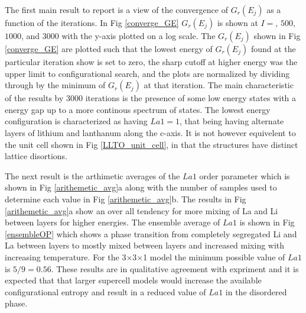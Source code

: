 \documentclass[aps,prl,reprint,superscriptaddress,showkeys]{revtex4-1}
\begin{document}
The first main result to report is a view of the convergence of $G_r(E_j)$ as a function of the iterations. In Fig \ref{converge_GE}  $G_r(E_j)$ is shown at  $I=$, $500$, $1000$, and $3000$ with the y-axis plotted on a log scale. The  $G_r(E_j)$ shown in Fig \ref{converge_GE}  are plotted such that the lowest energy of $G_r(E_j)$ found at the particular iteration show is set to zero, the sharp cutoff at higher energy was the upper limit to configurational search, and the plots are normalized by dividing through by the minimum of $G_r(E_j)$ at that iteration.  The main characteristic of the results by 3000 iterations is the presence of some low energy states with a energy gap up to a more continous spectrum of states. The lowest energy configuration is  characterized as having  $La1=1$, that being having alternate layers of lithium and lanthanum along the c-axis. It is not however equivelent to the unit cell shown in Fig \ref{LLTO_unit_cell}, in that the structures have distinct lattice disortions. 


The next result is the arthimetic averages of the $La1$  order parameter which is  shown in Fig \ref{arithemetic_avg}a along with the number of samples used to determine each value in Fig \ref{arithemetic_avg}b. The results in Fig \ref{arithemetic_avg}a show an over all tendency for more mixing of La and Li between layers for higher energies. The ensemble average of $La1$ is shown in Fig \ref{ensembleOP} which shows a phase transition from completely segregated Li and La between layers to mostly mixed between layers and increased mixing with increasing temperature. For the 3$\times$3$\times$1 model the minimum possible value of $La1$ is $5/9 = 0.56$. These results are in qualitative agreement with expriment and it is expected that that larger supercell models would increase the available configurational entropy and result in a reduced value of $La1$ in the disordered phase. 
\end{document}
